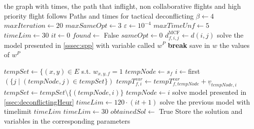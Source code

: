 \documentclass[../thesis.tex]{subfiles}
\begin{document}
\begin{algorithm}[H]
\begin{algorithmic}
\REQUIRE the graph with  times, the path that inflight, non collaborative flights and high priority flight follows 
\ENSURE Paths and times for tactical deconflicting
\STATE $\beta\gets 4$
\STATE $maxIteration\gets 20$
\STATE $maxSameOpt\gets 3$
\STATE $\varepsilon\gets 10^{-4}$
\STATE $maxTimeUnf\gets 5$
\STATE $timeLim\gets 30$
\STATE $it\gets 0$
\STATE $found\gets$ False
\STATE $sameOpt\gets 0$
    \STATE $d^\text{MCF}_{f,i,j}\gets d(i,j)$
\ENDFOR
{}  
    \STATE solve the model presented in \ref{sssec:spp} with variable called $w^P$
        \STATE \textbf{break}
    \ENDIF
    \STATE save in $w$ the values of $w^P$
\end{algorithmic}
\end{algorithm}
\begin{algorithm}
\begin{algorithmic}
    \STATE $tempSet\gets \{(x,y)\in E$ s.t. $w_{x,y,f}=1$
    \STATE $tempNode\gets s_f$
    \STATE $i\gets $first$(\{ j \mid (tempNode, j) \in tempSet \})$
    \STATE $tempT^{ear}_{f,i}\gets tempT^{ear}_{f,tempNode}+\underline v_{tempNode,i}$
    \STATE $tempSet\gets tempSet\setminus\{(tempNode,i)\}$
    \STATE $tempNode\gets i$
    \ENDWHILE
    \ENDFOR
    \STATE solve model presented in \ref{ssec:deconflictingHeur}
    \STATE $timeLim\gets 120\cdot (it+1)$
    \STATE solve the previous model with timelimit $timeLim$
    \STATE $timeLim\gets 30$
    \ENDIF
    \STATE $obtainedSol\gets$ True
    \STATE Store the solution and variables in the corresponding parameters
    \ENDIF
    \ENDIF
{}
    \end{algorithmic}
    \end{algorithm}
\end{document}
